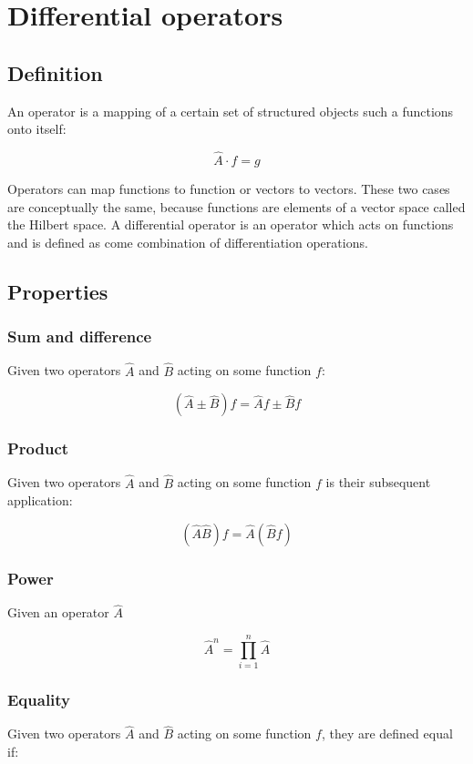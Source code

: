 \chapter{Differential operators}

\section{Definition}
An operator is a mapping of a certain set of structured objects such a functions onto itself:

$$\hat{A}\cdot f = g$$

Operators can map functions to function or vectors to vectors.
These two cases are conceptually the same, because functions are elements of a vector space called the Hilbert space.
A differential operator is an operator which acts on functions and is defined as come combination of differentiation operations.

\section{Properties}

	\subsection{Sum and difference}
	Given two operators $\hat{A}$ and $\hat{B}$ acting on some function $f$:

	$$(\hat{A} \pm\hat{B})f = \hat{A}f\pm \hat{B}f$$

	\subsection{Product}
	Given two operators $\hat{A}$ and $\hat{B}$ acting on some function $f$ is their subsequent application:

	$$(\hat{A}\hat{B})f = \hat{A}(\hat{B}f)$$

	\subsection{Power}
	Given an operator $\hat{A}$

	$$\hat{A}^n = \prod\limits_{i=1}^n\hat{A}$$

	\subsection{Equality}
	Given two operators $\hat{A}$ and $\hat{B}$ acting on some function $f$, they are defined equal if:

